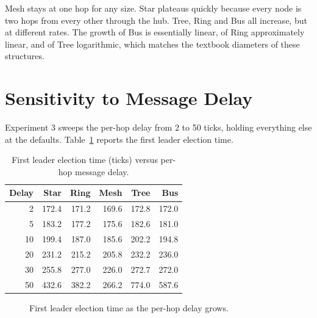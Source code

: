 Mesh stays at one hop for any size. Star plateaus quickly because every node is two hops from every other through the hub. Tree, Ring and Bus all increase, but at different rates. The growth of Bus is essentially linear, of Ring approximately linear, and of Tree logarithmic, which matches the textbook diameters of these structures.

\section{Sensitivity to Message Delay}

Experiment 3 sweeps the per-hop delay from 2 to 50 ticks, holding everything else at the defaults. Table~\ref{tab:exp3_election} reports the first leader election time.

\begin{table}[H]
\centering
\caption{First leader election time (ticks) versus per-hop message delay.}
\label{tab:exp3_election}
\begin{tabular}{rrrrrr}
\toprule
\textbf{Delay} & \textbf{Star} & \textbf{Ring} & \textbf{Mesh} & \textbf{Tree} & \textbf{Bus} \\
\midrule
2  & 172.4 & 171.2 & 169.6 & 172.8 & 172.0 \\
5  & 183.2 & 177.2 & 175.6 & 182.6 & 181.0 \\
10 & 199.4 & 187.0 & 185.6 & 202.2 & 194.8 \\
20 & 231.2 & 215.2 & 205.8 & 232.2 & 236.0 \\
30 & 255.8 & 277.0 & 226.0 & 272.7 & 272.0 \\
50 & 432.6 & 382.2 & 266.2 & 774.0 & 587.6 \\
\bottomrule
\end{tabular}
\end{table}

\begin{figure}[H]
\centering
{}
\caption{First leader election time as the per-hop delay grows.}
\label{fig:exp3_election}
\end{figure}

